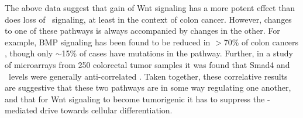 The above data suggest that gain of Wnt signaling has a more potent effect
than does loss of \tgfbsf\ signaling, at least in the context of colon cancer.
However, changes to one of these pathways is always accompanied by changes in the other.
For example, BMP signaling has been found to be reduced
in $>$70\% of colon cancers \cite{Hardwick2008}, though only $\sim$15\% of cases
have mutations in the pathway. Further, in a study of microarrays from 250
colorectal tumor samples it was found that Smad4 and
\bcat\ levels were generally anti-correlated
\cite{Freeman2012}. Taken together, these correlative
results are suggestive that these two pathways
are in some way regulating one another, and that for Wnt signaling to become
tumorigenic it has to suppress the
\tgfbsf-mediated drive towards cellular differentiation.

